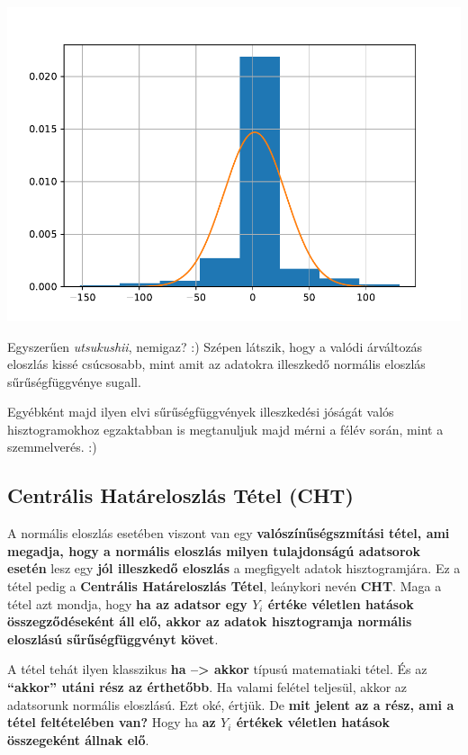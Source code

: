 \documentclass[
]{book}
\begin{document}
\includegraphics{_main_files/figure-latex/unnamed-chunk-170-1.pdf}

Egyszerűen \emph{utsukushii}, nemigaz? :) Szépen látszik, hogy a valódi árváltozás eloszlás kissé csúcsosabb, mint amit az adatokra illeszkedő normális eloszlás sűrűségfüggvénye sugall.

Egyébként majd ilyen elvi sűrűségfüggvények illeszkedési jóságát valós hisztogramokhoz egzaktabban is megtanuljuk majd mérni a félév során, mint a szemmelverés. :)

\subsection{Centrális Határeloszlás Tétel (CHT)}\label{centruxe1lis-hatuxe1reloszluxe1s-tuxe9tel-cht}

A normális eloszlás esetében viszont van egy \textbf{valószínűségszmítási tétel, ami megadja, hogy a normális eloszlás milyen tulajdonságú adatsorok esetén} lesz egy \textbf{jól illeszkedő eloszlás} a megfigyelt adatok hisztogramjára. Ez a tétel pedig a \textbf{Centrális Határeloszlás Tétel}, leánykori nevén \textbf{CHT}.
Maga a tétel azt mondja, hogy \textbf{ha az adatsor egy \(Y_i\) értéke véletlen hatások összegződéseként áll elő, akkor az adatok hisztogramja normális eloszlású sűrűségfüggvényt követ}.

A tétel tehát ilyen klasszikus \textbf{ha --\textgreater{} akkor} típusú matematiaki tétel. És az \textbf{``akkor'' utáni rész az érthetőbb}. Ha valami felétel teljesül, akkor az adatsorunk normális eloszlású. Ezt oké, értjük. De \textbf{mit jelent az a rész, ami a tétel feltételében van?} Hogy ha \textbf{az \(Y_i\) értékek véletlen hatások összegeként állnak elő}.
\end{document}
